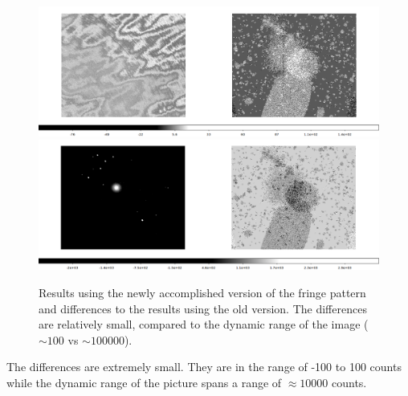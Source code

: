 \documentclass[11pt,a4paper,twoside]{article}
\begin{document}
\begin{figure}
\centering
\includegraphics[width=\linewidth]{../pic/diff_fringe}
\includegraphics[width=\linewidth]{../pic/diff_result}
\caption{Results using the newly accomplished version of the fringe pattern
        and differences to the results using the old version. The differences
        are relatively small, compared to the dynamic range of the image ($\sim
        100$ vs $\sim 100000$).}
\label{fig:df}
\end{figure}

The differences are extremely small. They are in the range of -100 to 100 counts
while the dynamic range of the picture spans a range of $\approx 10000$ counts.
\end{document}
